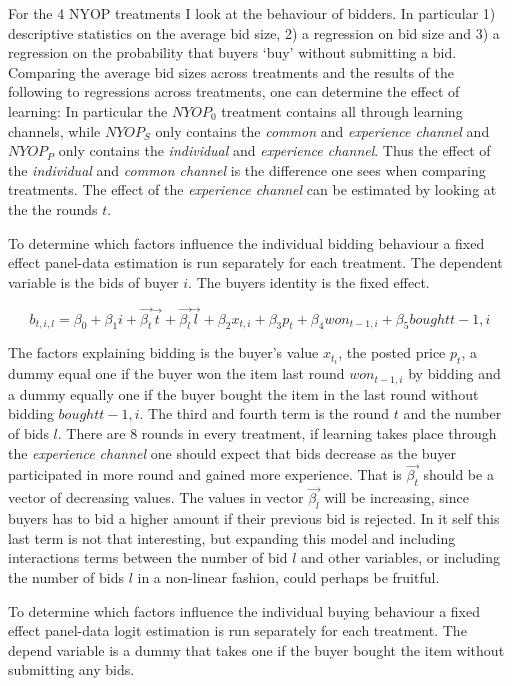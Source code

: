 \documentclass[a4paper,12pt]{article}
\begin{document}
	For the 4 NYOP treatments I look at the behaviour of bidders. In particular 1) descriptive statistics on the average bid size, 2) a regression on bid size and 3) a regression on the probability that buyers `buy' without submitting a bid. Comparing the average bid sizes across treatments and the results of the following to regressions across treatments, one can determine the effect of learning: In particular the $NYOP_0$ treatment contains all through learning channels, while $NYOP_S$ only contains the \emph{common} and \emph{experience channel} and $NYOP_P$ only contains the \emph{individual} and \emph{experience channel}. Thus the effect of the \emph{individual} and \emph{common channel} is the difference one sees when comparing treatments. The effect of the \emph{experience channel} can be estimated by looking at the the rounds $t$.

	To determine which factors influence the individual bidding behaviour a fixed effect panel-data estimation is run separately for each treatment. The dependent variable is the bids of buyer $i$. The buyers identity is the fixed effect.

	\[ b_{t,i,l} = \beta_0 + \beta_1 i + \vec{\beta_t} \vec{t} + \vec{\beta_l} \vec{l} + \beta_2 x_{t,i} + \beta_3 p_t + \beta_4 won_{t-1,i} + \beta_5 bought{t-1,i} \]

	The factors explaining bidding is the buyer's value $x_{t_i}$, the posted price $p_t$, a dummy equal one if the buyer won the item last round $won_{t-1,i}$ by bidding and a dummy equally one if the buyer bought the item in the last round without bidding $bought{t-1,i}$. The third and fourth term is the round $t$ and the number of bids $l$. There are 8 rounds in every treatment, if learning takes place through the \emph{experience channel} one should expect that bids decrease as the buyer participated in more round and gained more experience. That is $\vec{\beta_t}$ should be a vector of decreasing values. The values in vector $\vec{\beta_l}$ will be increasing, since buyers has to bid a higher amount if their previous bid is rejected. In it self this last term is not that interesting, but expanding this model and including interactions terms between the number of bid $l$ and other variables, or including the number of bids $l$ in a non-linear fashion, could perhaps be fruitful.

	To determine which factors influence the individual buying behaviour a fixed effect  panel-data logit estimation is run separately for each treatment. The depend variable is a dummy that takes one if the buyer bought the item without submitting any bids.
\end{document}
